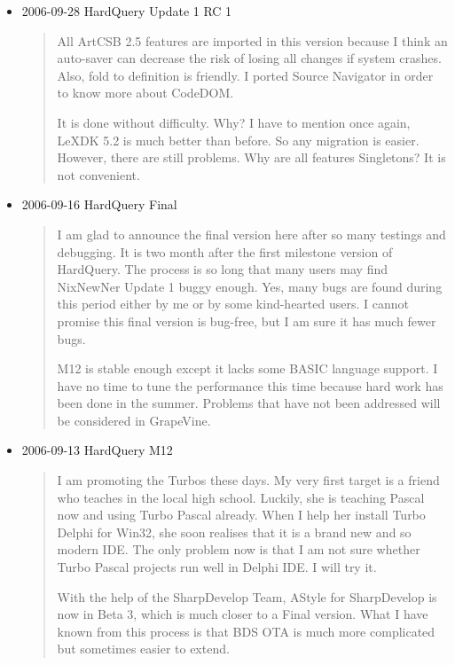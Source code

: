 \begin{itemize}
  \item 2006-09-28 HardQuery Update 1 RC 1
  \begin{quotation}
    All ArtCSB 2.5 features are imported in this version because I think an
    auto-saver can decrease the risk of losing all changes if system crashes.
    Also, fold to definition is friendly. I ported Source Navigator in order to
    know more about CodeDOM.

    It is done without difficulty. Why? I have to mention once again, LeXDK 5.2
    is much better than before. So any migration is easier. However, there are
    still problems. Why are all features Singletons? It is not convenient.
  \end{quotation}

  \item 2006-09-16 HardQuery Final
  \begin{quotation}
    I am glad to announce the final version here after so many testings and
    debugging. It is two month after the first milestone version of HardQuery.
    The process is so long that many users may find NixNewNer Update 1 buggy
    enough. Yes, many bugs are found during this period either by me or by some
    kind-hearted users. I cannot promise this final version is bug-free, but I
    am sure it has much fewer bugs.

    M12 is stable enough except it lacks some BASIC language support. I have
    no time to tune the performance this time because hard work has been done
    in the summer. Problems that have not been addressed will be considered
    in GrapeVine.
  \end{quotation}

  \item 2006-09-13 HardQuery M12
  \begin{quotation}
    I am promoting the Turbos these days. My very first target is a friend
    who teaches in the local high school. Luckily, she is teaching Pascal now
    and using Turbo Pascal already. When I help her install Turbo Delphi for
    Win32, she soon realises that it is a brand new and so modern IDE. The
    only problem now is that I am not sure whether Turbo Pascal projects run
    well in Delphi IDE. I will try it.

    With the help of the SharpDevelop Team, AStyle for Sharp\-Develop is now
    in Beta 3, which is much closer to a Final version. What I have known
    from this process is that BDS OTA is much more complicated but
    sometimes easier to extend.


\end{quotation}
\end{itemize}
